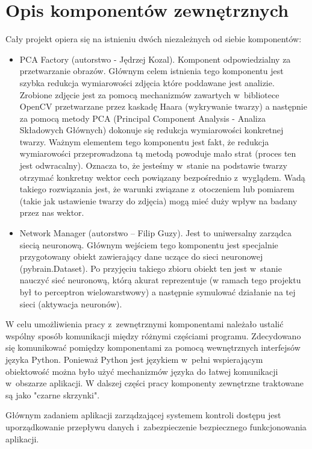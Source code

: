 \documentclass[oneside, eng]{mgr}
\begin{document}
\section{Opis komponentów zewnętrznych}
Cały projekt opiera się na istnieniu dwóch niezależnych od siebie komponentów:
\begin{itemize}
\item PCA Factory (autorstwo - Jędrzej Kozal). Komponent odpowiedzialny za przetwarzanie obrazów.
Głównym celem istnienia tego komponentu jest szybka redukcja wymiarowości zdjęcia które poddawane jest analizie.
Zrobione zdjęcie jest za pomocą mechanizmów zawartych w~bibliotece OpenCV przetwarzane przez kaskadę Haara (wykrywanie twarzy)
a następnie za pomocą metody PCA (Principal Component Analysis - Analiza Składowych Głównych)
dokonuje się redukcja wymiarowości konkretnej twarzy.
Ważnym elementem tego komponentu jest fakt, że redukcja wymiarowości
przeprowadzona tą metodą powoduje mało strat (proces ten jest odwracalny).
Oznacza to, że jesteśmy w~stanie na podstawie twarzy otrzymać konkretny wektor
cech powiązany bezpośrednio z~wyglądem. Wadą takiego rozwiązania jest,
że warunki związane z~otoczeniem lub pomiarem (takie jak ustawienie twarzy do zdjęcia) mogą mieć
duży wpływ na badany przez nas wektor.
\item Network Manager (autorstwo -- Filip Guzy). Jest to uniwersalny zarządca siecią neuronową.
Głównym wejściem tego komponentu jest specjalnie przygotowany obiekt zawierający dane uczące do sieci neuronowej (pybrain.Dataset).
Po przyjęciu takiego zbioru obiekt ten jest w~stanie nauczyć sieć neuronową, którą akurat reprezentuje
(w ramach tego projektu był to perceptron wielowarstwowy) a następnie symulować działanie na tej sieci (aktywacja neuronów).
\end{itemize}

W celu umożliwienia pracy z~zewnętrznymi komponentami
należało ustalić wspólny sposób komunikacji między różnymi częściami programu.
Zdecydowano się komunikować pomiędzy komponentami za pomocą wewnętrznych interfejsów języka Python.
Ponieważ Python jest językiem w~pełni wspierającym obiektowość można było użyć
mechanizmów języka do łatwej komunikacji w~obszarze aplikacji.
W dalszej części pracy komponenty zewnętrzne traktowane są jako "czarne skrzynki".

Głównym zadaniem aplikacji zarządzającej systemem kontroli dostępu jest
uporządkowanie przepływu danych i~zabezpieczenie bezpiecznego funkcjonowania
aplikacji.

\newpage
\end{document}
